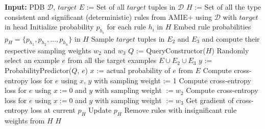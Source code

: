 \documentclass[akbc,twoside,11pt]{article}
\newcounter{example}
\newcommand{\algorithmname}{SafeLearner\xspace}
\begin{document}
\begin{algorithm}
\begin{small}
\caption{\algorithmname\ -- Main Algorithm}\label{alg:main}
\begin{algorithmic}[1]
\State \textbf{Input:} PDB $\mathcal{D}$, $target$
\State $E$ := Set of all $target$ tuples in $\mathcal{D}$
\State $H$ := Set of all the type consistent and significant (deterministic) rules from AMIE+ using $\mathcal{D}$ with $target$ in head \label{alg_line:amie}
\State Initialize probability $p_{h_i}$ for each rule $h_i$ in $H$ \label{alg_line:init1}
\State Embed rule probabilities $p_H = \{p_{h_1}, p_{h_2}, \ldots, p_{h_n}\}$ in $H$ \label{alg_line:init2}
\State Sample $target$ tuples in $E_2$ and $E_3$ and compute their respective sampling weights $w_2$ and $w_3$ \label{alg_line:samp}
\State $Q$ := QueryConstructor($H$)  \label{alg_line:QC}
 \label{alg_line:SGD1}
    \State Randomly select an example $e$ from all the target examples $E \cup E_2 \cup E_3$
    \State $y$ := ProbabilityPredictor($Q$, $e$)  \label{alg_line:PP}
        \State $x$ := actual probability of $e$ from $E$
        \State Compute cross-entropy loss for $e$ using $x$, $y$ with sampling weight := 1
        \State Compute cross-entropy loss for $e$ using $x := 0$ and $y$ with sampling weight $:= w_2$
        \State Compute cross-entropy loss for $e$ using $x := 0$ and $y$ with sampling weight $:= w_3$
    \EndIf \State Get gradient of  cross-entropy loss at current $p_H$
    \State Update $p_H$
\EndFor \label{alg_line:SGD2}
\State Remove rules with insignificant rule weights from $H$ \label{alg_line:prune}
\State \Return $H$
\end{algorithmic}
\end{small}
\end{algorithm}
\end{document}
